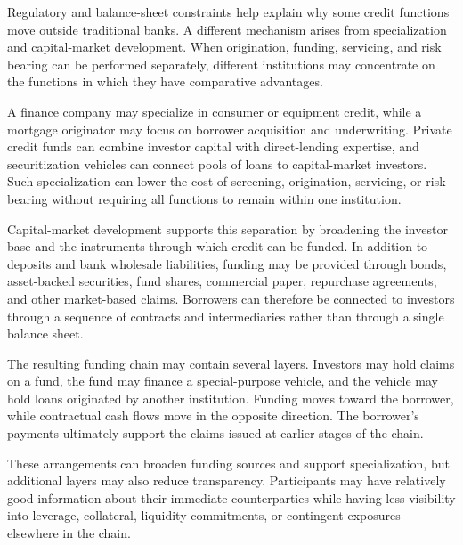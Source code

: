 Regulatory and balance-sheet constraints help explain why some credit functions move outside traditional banks. A different mechanism arises from specialization and capital-market development. When origination, funding, servicing, and risk bearing can be performed separately, different institutions may concentrate on the functions in which they have comparative advantages.

A finance company may specialize in consumer or equipment credit, while a mortgage originator may focus on borrower acquisition and underwriting. Private credit funds can combine investor capital with direct-lending expertise, and securitization vehicles can connect pools of loans to capital-market investors. Such specialization can lower the cost of screening, origination, servicing, or risk bearing without requiring all functions to remain within one institution.

Capital-market development supports this separation by broadening the investor base and the instruments through which credit can be funded. In addition to deposits and bank wholesale liabilities, funding may be provided through bonds, asset-backed securities, fund shares, commercial paper, repurchase agreements, and other market-based claims. Borrowers can therefore be connected to investors through a sequence of contracts and intermediaries rather than through a single balance sheet.

The resulting funding chain may contain several layers. Investors may hold claims on a fund, the fund may finance a special-purpose vehicle, and the vehicle may hold loans originated by another institution. Funding moves toward the borrower, while contractual cash flows move in the opposite direction. The borrower's payments ultimately support the claims issued at earlier stages of the chain.

These arrangements can broaden funding sources and support specialization, but additional layers may also reduce transparency. Participants may have relatively good information about their immediate counterparties while having less visibility into leverage, collateral, liquidity commitments, or contingent exposures elsewhere in the chain.

